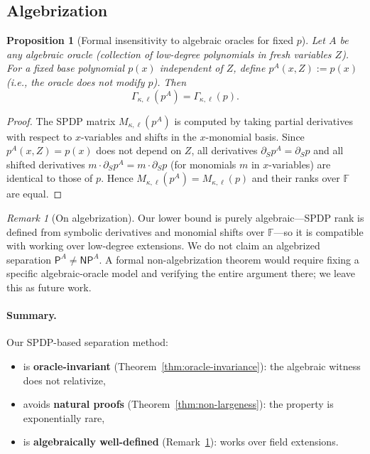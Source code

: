 \documentclass[12pt]{article}
\newtheorem{proposition}[theorem]{Proposition}
\theoremstyle{definition}
\theoremstyle{definition}
\theoremstyle{remark}
\newtheorem{remark}{Remark}
\theoremstyle{remark}
\begin{document}
\subsection{Algebrization}

\begin{proposition}[Formal insensitivity to algebraic oracles for fixed $p$]\label{prop:algebraic-oracle-invariance}
Let $A$ be any algebraic oracle (collection of low-degree polynomials in fresh variables $Z$). For a fixed base polynomial $p(x)$ independent of $Z$, define $p^A(x,Z) := p(x)$ (i.e., the oracle does not modify $p$). Then
\[
\Gamma_{\kappa,\ell}(p^A) = \Gamma_{\kappa,\ell}(p).
\]
\end{proposition}

\begin{proof}
The SPDP matrix $M_{\kappa,\ell}(p^A)$ is computed by taking partial derivatives with respect to $x$-variables and shifts in the $x$-monomial basis. Since $p^A(x,Z) = p(x)$ does not depend on $Z$, all derivatives $\partial_S p^A = \partial_S p$ and all shifted derivatives $m \cdot \partial_S p^A = m \cdot \partial_S p$ (for monomials $m$ in $x$-variables) are identical to those of $p$. Hence $M_{\kappa,\ell}(p^A) = M_{\kappa,\ell}(p)$ and their ranks over $\mathbb{F}$ are equal.
\end{proof}

\begin{remark}[On algebrization]\label{rem:algebrization}
Our lower bound is purely algebraic---SPDP rank is defined from symbolic derivatives and monomial shifts over $\mathbb{F}$---so it is compatible with working over low-degree extensions. We do not claim an algebrized separation $\mathsf{P}^A \neq \mathsf{NP}^A$. A formal non-algebrization theorem would require fixing a specific algebraic-oracle model and verifying the entire argument there; we leave this as future work.
\end{remark}

\paragraph{Summary.}
Our SPDP-based separation method:
\begin{itemize}
\item is \textbf{oracle-invariant} (Theorem~\ref{thm:oracle-invariance}): the algebraic witness does not relativize,
\item avoids \textbf{natural proofs} (Theorem~\ref{thm:non-largeness}): the property is exponentially rare,
\item is \textbf{algebraically well-defined} (Remark~\ref{rem:algebrization}): works over field extensions.
\end{itemize}
\end{document}
